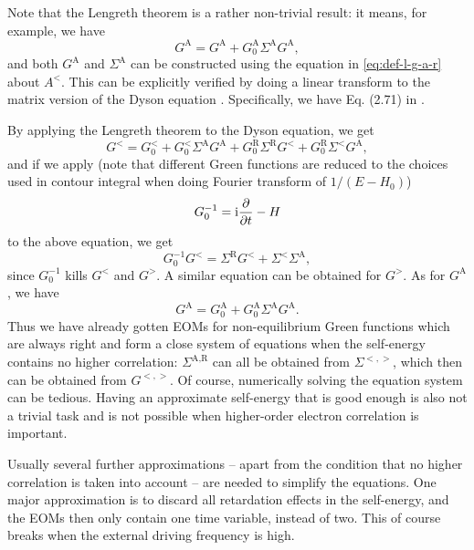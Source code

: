 \documentclass[hyperref, a4paper]{article}
\newcommand*{\ii}{\mathrm{i}}
\begin{document}
Note that the Lengreth theorem is a rather non-trivial result: 
it means, for example, we have 
\begin{equation}
    G^{\text{A}} = G^{ \text{A}} + G_0^{ \text{A}} \Sigma^{\text{A}} G^{\text{A}},
\end{equation}
and both $G^{\text{A}}$ and $\Sigma^{\text{A}}$
can be constructed using the equation in \eqref{eq:def-l-g-a-r} about $A^<$.
This can be explicitly verified by 
doing a linear transform to the matrix version of the Dyson equation 
\cite{rammer1986quantum}.
Specifically, we have Eq. (2.71) in \cite{rammer1986quantum}.

By applying the Lengreth theorem to the Dyson equation, we get 
\cite{rammer1986quantum,vspivcka2005long}
\begin{equation}
    G^< = G^<_0 + G^<_0 \Sigma^{\text{A}} G^{\text{A}}
    + G_0^{\text{R}} \Sigma^{\text{R}} G^< 
    + G_0^{\text{R}} \Sigma^{<} G^\text{A} ,
\end{equation}
and if we apply (note that different Green functions are reduced to 
the choices used in contour integral when doing Fourier transform of $1 / (E - H_0)$)
\begin{equation}
    G_0^{-1} = \ii \pdv{t} - H
\end{equation}
to the above equation, we get 
\begin{equation}
    G_0^{-1} G^< = \Sigma^{\text{R}} G^< + \Sigma^< \Sigma^{\text{A}},
\end{equation}
since $G_0^{-1}$ kills $G^<$ and $G^>$.
A similar equation can be obtained for $G^>$.
As for $G^{\text{A}}$, we have 
\begin{equation}
    G^{\text{A}} = G^{\text{A}}_0 + G^{\text{A}}_0 \Sigma^{\text{A}} G^{\text{A}}.
\end{equation}
Thus we have already gotten EOMs for non-equilibrium Green functions 
which are always right
and form a close system of equations
when the self-energy contains no higher correlation: 
$\Sigma^{\text{A}, \text{R}}$ can all be obtained from $\Sigma^{<,>}$,
which then can be obtained from $G^{<, >}$.
Of course, numerically solving the equation system can be tedious. 
Having an approximate self-energy that is good enough
is also not a trivial task and is not possible 
when higher-order electron correlation is important.

Usually several further approximations -- apart from 
the condition that no higher correlation is taken into account --
are needed to simplify the equations.
One major approximation is to discard all retardation effects in the self-energy,
and the EOMs then only contain one time variable,
instead of two.
This of course breaks when the external driving frequency is high.
\end{document}
